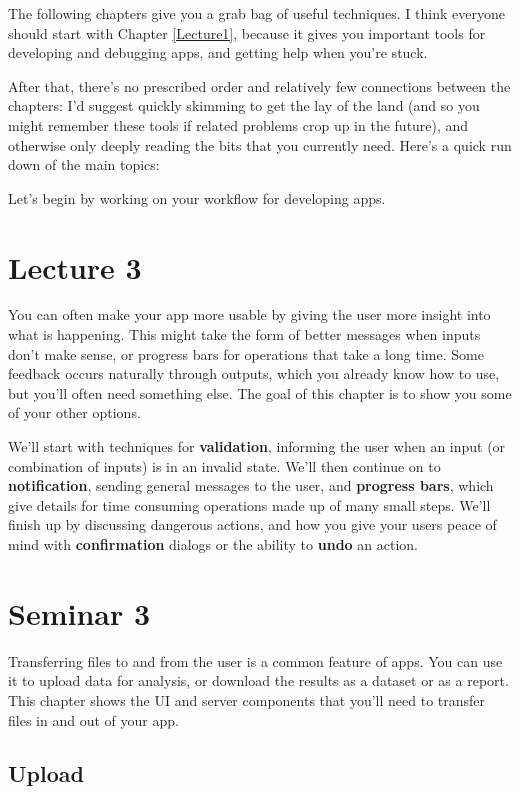 \documentclass[
]{article}
\begin{document}
The following chapters give you a grab bag of useful techniques.
I think everyone should start with Chapter \ref{Lecture1}, because it gives you important tools for developing and debugging apps, and getting help when you're stuck.

After that, there's no prescribed order and relatively few connections between the chapters: I'd suggest quickly skimming to get the lay of the land (and so you might remember these tools if related problems crop up in the future), and otherwise only deeply reading the bits that you currently need.
Here's a quick run down of the main topics:

Let's begin by working on your workflow for developing apps.

\hypertarget{lecture3}{%
\section{Lecture 3}\label{lecture3}}

You can often make your app more usable by giving the user more insight into what is happening.
This might take the form of better messages when inputs don't make sense, or progress bars for operations that take a long time.
Some feedback occurs naturally through outputs, which you already know how to use, but you'll often need something else.
The goal of this chapter is to show you some of your other options.

We'll start with techniques for \textbf{validation}, informing the user when an input (or combination of inputs) is in an invalid state.
We'll then continue on to \textbf{notification}, sending general messages to the user, and \textbf{progress bars}, which give details for time consuming operations made up of many small steps.
We'll finish up by discussing dangerous actions, and how you give your users peace of mind with \textbf{confirmation} dialogs or the ability to \textbf{undo} an action.

\hypertarget{seminar3}{%
\section{Seminar 3}\label{seminar3}}

Transferring files to and from the user is a common feature of apps.
You can use it to upload data for analysis, or download the results as a dataset or as a report.
This chapter shows the UI and server components that you'll need to transfer files in and out of your app.

\hypertarget{upload}{%
\subsection{Upload}\label{upload}}
\end{document}
